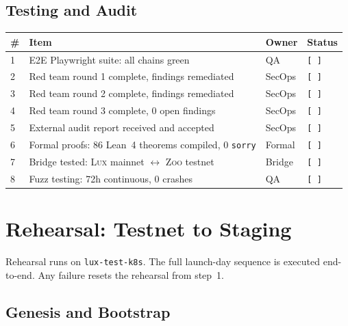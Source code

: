 \documentclass[11pt,letterpaper]{article}
\newcommand{\pending}{\texttt{[ ]}}
\newcommand{\Zoo}{\textsc{Zoo}}
\newcommand{\Lux}{\textsc{Lux}}
\begin{document}
\subsection{Testing and Audit}

\begin{tabularx}{\textwidth}{@{}l X l l@{}}
\toprule
\textbf{\#} & \textbf{Item} & \textbf{Owner} & \textbf{Status} \\
\midrule
1 & E2E Playwright suite: all chains green           & QA     & \pending \\
2 & Red team round 1 complete, findings remediated    & SecOps & \pending \\
3 & Red team round 2 complete, findings remediated    & SecOps & \pending \\
4 & Red team round 3 complete, 0 open findings        & SecOps & \pending \\
5 & External audit report received and accepted        & SecOps & \pending \\
6 & Formal proofs: 86 Lean~4 theorems compiled, 0 \texttt{sorry} & Formal & \pending \\
7 & Bridge tested: \Lux{} mainnet $\leftrightarrow$ \Zoo{} testnet & Bridge & \pending \\
8 & Fuzz testing: 72h continuous, 0 crashes            & QA     & \pending \\
\bottomrule
\end{tabularx}

\section{Rehearsal: Testnet to Staging}

Rehearsal runs on \texttt{lux-test-k8s}. The full launch-day sequence is
executed end-to-end. Any failure resets the rehearsal from step~1.

\subsection{Genesis and Bootstrap}
\end{document}
